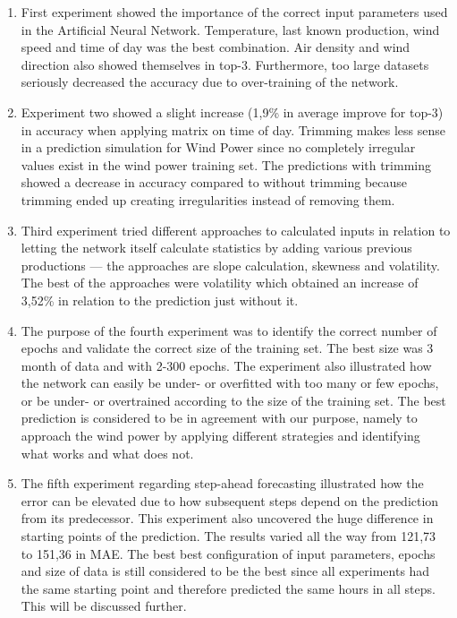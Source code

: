 \begin{enumerate}
\item First experiment showed the importance of the correct input parameters used in the Artificial Neural Network. Temperature, last known production, wind speed and time of day was the best combination. Air density and wind direction also showed themselves in top-3. Furthermore, too large datasets seriously decreased the accuracy due to over-training of the network.
\item Experiment two showed a slight increase (1,9\% in average improve for top-3) in accuracy when applying matrix on time of day. Trimming makes less sense in a prediction simulation for Wind Power since no completely irregular values exist in the wind power training set. The predictions with trimming showed a decrease in accuracy compared to without trimming because trimming ended up creating irregularities instead of removing them.
\item Third experiment tried different approaches to calculated inputs in relation to letting the network itself calculate statistics by adding various previous productions --- the approaches are slope calculation, skewness and volatility. The best of the approaches were volatility which obtained an increase of 3,52\% in relation to the prediction just without it.
\item The purpose of the fourth experiment was to identify the correct number of epochs and validate the correct size of the training set. The best size was 3 month of data and with 2-300 epochs. The experiment also illustrated how the network can easily be under- or overfitted with too many or few epochs, or be under- or overtrained  according to the size of the training set. The best prediction is considered to be in agreement with our purpose, namely to approach the wind power by applying different strategies and identifying what works and what does not.	
\item The fifth experiment regarding step-ahead forecasting illustrated how the error can be elevated due to how subsequent steps depend on the prediction from its predecessor. This experiment also uncovered the huge difference in starting points of the prediction. The results varied all the way from 121,73 to 151,36 in MAE. The best best configuration of input parameters, epochs and size of data is still considered to be the best since all experiments had the same starting point and therefore predicted the same hours in all steps. This will be discussed further.
\end{enumerate}

